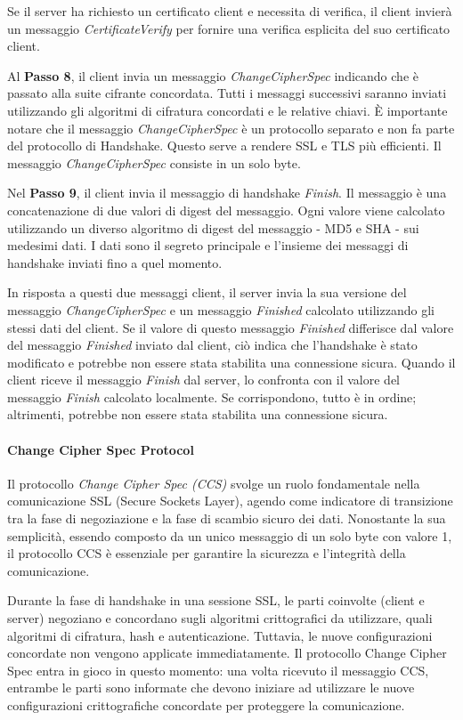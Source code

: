 \documentclass{article}
\theoremstyle{definition}
\begin{document}
Se il server ha richiesto un certificato client e necessita di verifica, il client invierà un messaggio \textit{CertificateVerify} per fornire una verifica esplicita del suo certificato client.

Al \textbf{Passo 8}, il client invia un messaggio \textit{ChangeCipherSpec} indicando che è passato alla suite cifrante concordata. Tutti i messaggi successivi saranno inviati utilizzando gli algoritmi di cifratura concordati e le relative chiavi. È importante notare che il messaggio \textit{ChangeCipherSpec} è un protocollo separato e non fa parte del protocollo di Handshake. Questo serve a rendere SSL e TLS più efficienti. Il messaggio \textit{ChangeCipherSpec} consiste in un solo byte.

Nel \textbf{Passo 9}, il client invia il messaggio di handshake \textit{Finish}. Il messaggio è una concatenazione di due valori di digest del messaggio. Ogni valore viene calcolato utilizzando un diverso algoritmo di digest del messaggio - MD5 e SHA - sui medesimi dati. I dati sono il segreto principale e l'insieme dei messaggi di handshake inviati fino a quel momento.

In risposta a questi due messaggi client, il server invia la sua versione del messaggio \textit{ChangeCipherSpec} e un messaggio \textit{Finished} calcolato utilizzando gli stessi dati del client. Se il valore di questo messaggio \textit{Finished} differisce dal valore del messaggio \textit{Finished} inviato dal client, ciò indica che l'handshake è stato modificato e potrebbe non essere stata stabilita una connessione sicura. Quando il client riceve il messaggio \textit{Finish} dal server, lo confronta con il valore del messaggio \textit{Finish} calcolato localmente. Se corrispondono, tutto è in ordine; altrimenti, potrebbe non essere stata stabilita una connessione sicura.

\paragraph{Change Cipher Spec Protocol}
Il protocollo \textit{Change Cipher Spec (CCS)} svolge un ruolo fondamentale nella comunicazione SSL (Secure Sockets Layer), agendo come indicatore di transizione tra la fase di negoziazione e la fase di scambio sicuro dei dati. Nonostante la sua semplicità, essendo composto da un unico messaggio di un solo byte con valore 1, il protocollo CCS è essenziale per garantire la sicurezza e l'integrità della comunicazione.

Durante la fase di handshake in una sessione SSL, le parti coinvolte (client e server) negoziano e concordano sugli algoritmi crittografici da utilizzare, quali algoritmi di cifratura, hash e autenticazione. Tuttavia, le nuove configurazioni concordate non vengono applicate immediatamente. Il protocollo Change Cipher Spec entra in gioco in questo momento: una volta ricevuto il messaggio CCS, entrambe le parti sono informate che devono iniziare ad utilizzare le nuove configurazioni crittografiche concordate per proteggere la comunicazione.
\end{document}
